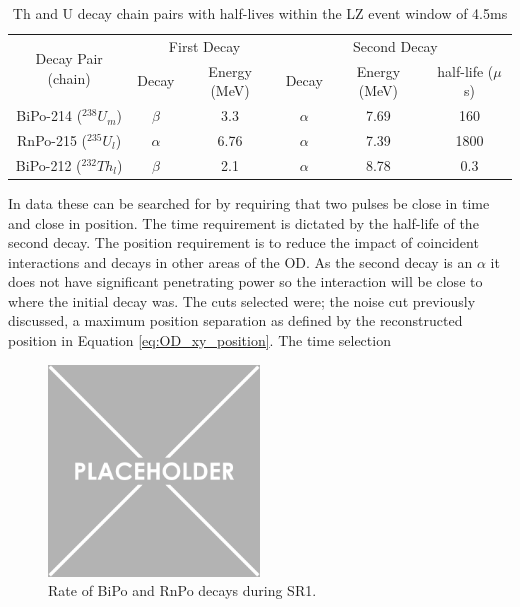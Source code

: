 \begin{table}[!htbp]
    \centering
    \begin{tabular}{c|c|c|c|c|c}
        \multirow{2}{*}{Decay Pair (chain)} & \multicolumn{2}{c|}{First Decay}    & \multicolumn{3}{c}{Second Decay}    \\ 
                                            & Decay    & Energy (MeV) & Decay    & Energy (MeV) & half-life ($\mu$s) \\ \hline
        BiPo-214 (${}^{238}U_{m}$)          & $\beta$  & 3.3          & $\alpha$ & 7.69         & 160   \\ 
        RnPo-215 (${}^{235}U_{l}$)          & $\alpha$ & 6.76         & $\alpha$ & 7.39         & 1800  \\ 
        BiPo-212 (${}^{232}Th_{l}$)         & $\beta$  & 2.1          & $\alpha$ & 8.78         & 0.3
    \end{tabular}
    \caption{Th and U decay chain pairs with half-lives within the LZ event window of 4.5ms}
    \label{tab:od_constrainable_decays_in_data}
\end{table}

\par
In data these can be searched for by requiring that two pulses be close in time and close in position. 
The time requirement is dictated by the half-life of the second decay.
The position requirement is to reduce the impact of coincident interactions and decays in other areas of the OD.
As the second decay is an $\alpha$ it does not have significant penetrating power so the interaction will be close to where the initial decay was.
The cuts selected were; the noise cut previously discussed, a maximum position separation as defined by the reconstructed position in Equation \ref{eq:OD_xy_position}.
The time selection


\begin{figure}
    \centering
    \includegraphics[width=0.5\textwidth]{Figures/Placeholder.png}
    \caption{Rate of BiPo and RnPo decays during SR1.}
    \label{fig:OD_BiPo_Rate}
\end{figure}

